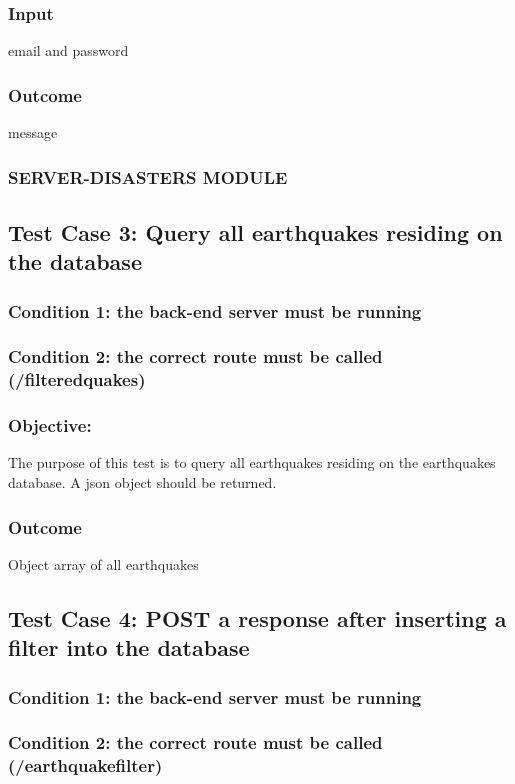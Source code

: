 \subsubsection{Input}
{email and password}
\subsubsection{Outcome}
{message}


\subsubsection*{SERVER-DISASTERS MODULE}

\subsection{Test Case 3: Query all earthquakes residing on the database}
\subsubsection{Condition 1: the back-end server must be running}
\subsubsection{Condition 2: the correct route must be called (/filteredquakes)}
\subsubsection{Objective:} The purpose of this test is to query all earthquakes residing on the earthquakes database. A json object should be returned.
\subsubsection{Outcome}
Object array of all earthquakes

\subsection{Test Case 4: POST a response after inserting a filter into the database}
\subsubsection{Condition 1: the back-end server must be running}
\subsubsection{Condition 2: the correct route must be called (/earthquakefilter)}
